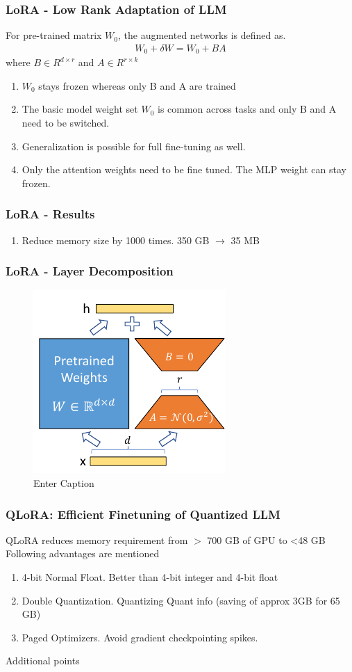 \documentclass{beamer}
\theoremstyle{plain}
\theoremstyle{definition}
\theoremstyle{remark}
\numberwithin{equation}{section}
\numberwithin{figure}{section}
\numberwithin{theorem}{section}
\renewcommand{\to}{\longrightarrow}
\begin{document}
\begin{frame}[shrink]
\frametitle{LoRA - Low Rank Adaptation of LLM}
For pre-trained matrix $W_0$, the augmented networks is defined as.
\begin{align}
    W_0 + \delta W = W_0 + BA
\end{align}
where $B \in R^{d \times r}$ and $A\in R^{r\times k}$
\begin{enumerate}
\item $W_0$ stays frozen whereas only B and A are trained
\item The basic model weight set $W_0$ is common across tasks and only B and A need to be switched.
\item Generalization is possible for full fine-tuning as well.
\item Only the attention weights need to be fine tuned. The MLP weight can stay frozen.
\end{enumerate}
\end{frame}

\begin{frame}
\frametitle{LoRA - Results}
\begin{enumerate}
    \item Reduce memory size by 1000 times. 350 GB $\to$ 35 MB
\end{enumerate}
\end{frame}


\begin{frame}
\frametitle{LoRA - Layer Decomposition}
\begin{figure}
    \centering
    \includegraphics[width=0.5\linewidth]{lora.png}
    \caption{Enter Caption}
    \label{fig:enter-label}
\end{figure}
\end{frame}


\begin{frame}
\frametitle{QLoRA: Efficient Finetuning of Quantized LLM}
QLoRA reduces memory requirement from $>$ 700 GB of GPU to <48 GB
Following advantages are mentioned
\begin{enumerate}
    \item 4-bit Normal Float. Better than 4-bit integer and 4-bit float
    \item Double Quantization. Quantizing Quant info (saving of approx 3GB for 65 GB)
    \item Paged Optimizers. Avoid gradient checkpointing spikes.
\end{enumerate}
\end{frame}
Additional points
\end{document}
